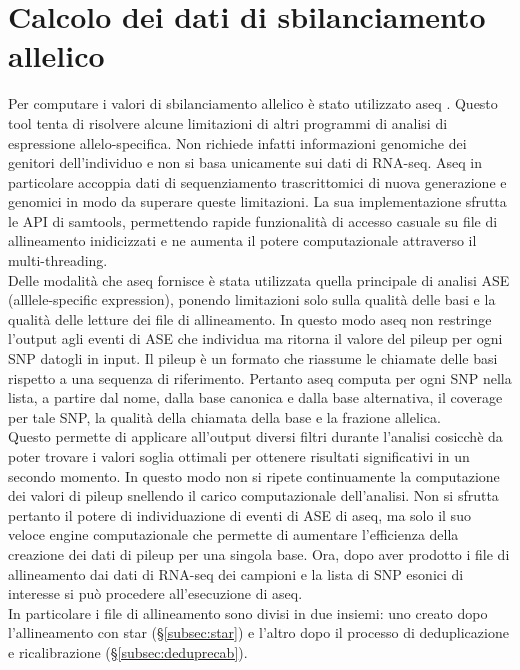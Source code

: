   \section{Calcolo dei dati di sbilanciamento allelico}
  \label{sec:aseq}
  Per computare i valori di sbilanciamento allelico \`e stato utilizzato aseq \cite{aseq}.
  Questo tool tenta di risolvere alcune limitazioni di altri programmi di analisi di espressione allelo-specifica.
  Non richiede infatti informazioni genomiche dei genitori dell'individuo e non si basa unicamente sui dati di RNA-seq.
  Aseq in particolare accoppia dati di sequenziamento trascrittomici di nuova generazione e genomici in modo da superare queste limitazioni.
  La sua implementazione sfrutta le API di samtools, permettendo rapide funzionalit\`a di accesso casuale su file di allineamento inidicizzati e ne aumenta il potere computazionale attraverso il multi-threading.\\
  Delle modalit\`a che aseq fornisce \`e stata utilizzata quella principale di analisi ASE (alllele-specific expression), ponendo limitazioni solo sulla qualit\`a delle basi e la qualit\`a delle letture dei file di allineamento.
  In questo modo aseq non restringe l'output agli eventi di ASE che individua ma ritorna il valore del pileup per ogni SNP datogli in input.
  Il pileup \`e un formato che riassume le chiamate delle basi rispetto a una sequenza di riferimento.
  Pertanto aseq computa per ogni SNP nella lista, a partire dal nome, dalla base canonica e dalla base alternativa, il coverage per tale SNP, la qualit\`a della chiamata della base e la frazione allelica.\\
  Questo permette di applicare all'output diversi filtri durante l'analisi cosicch\`e da poter trovare i valori soglia ottimali per ottenere risultati significativi in un secondo momento.
  In questo modo non si ripete continuamente la computazione dei valori di pileup snellendo il carico computazionale dell'analisi.
  Non si sfrutta pertanto il potere di individuazione di eventi di ASE di aseq, ma solo il suo veloce engine computazionale che permette di aumentare l'efficienza della creazione dei dati di pileup per una singola base.
  Ora, dopo aver prodotto i file di allineamento dai dati di RNA-seq dei campioni e la lista di SNP esonici di interesse si pu\`o procedere all'esecuzione di aseq.\\
  In particolare i file di allineamento sono divisi in due insiemi: uno creato dopo l'allineamento con star (\S\ref{subsec:star}) e l'altro dopo il processo di deduplicazione e ricalibrazione (\S\ref{subsec:deduprecab}).
